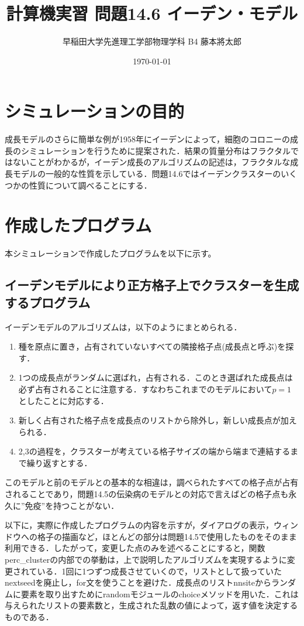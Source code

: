 \documentclass{jsarticle}
\title{計算機実習 問題14.6 イーデン・モデル}
\author{早稲田大学先進理工学部物理学科 B4 藤本將太郎}
\date{\today}
\begin{document}
\maketitle
    
\section{シミュレーションの目的}
        成長モデルのさらに簡単な例が1958年にイーデンによって，細胞のコロニーの成長のシミュレーションを行うために提案された．結果の質量分布はフラクタルではないことがわかるが，イーデン成長のアルゴリズムの記述は，フラクタルな成長モデルの一般的な性質を示している．問題14.6ではイーデンクラスターのいくつかの性質について調べることにする．

\section{作成したプログラム}
    本シミュレーションで作成したプログラムを以下に示す。


    \subsection{イーデンモデルにより正方格子上でクラスターを生成するプログラム}
    
        イーデンモデルのアルゴリズムは，以下のようにまとめられる．
        \begin{enumerate}
            \item 種を原点に置き，占有されていないすべての隣接格子点(成長点と呼ぶ)を探す．
            \item 1つの成長点がランダムに選ばれ，占有される．このとき選ばれた成長点は必ず占有されることに注意する．すなわちこれまでのモデルにおいて$p=1$としたことに対応する．
            \item 新しく占有された格子点を成長点のリストから除外し，新しい成長点が加えられる．
            \item 2,3の過程を，クラスターが考えている格子サイズの端から端まで連結するまで繰り返すとする．
            
        \end{enumerate}
        
        このモデルと前のモデルとの基本的な相違は，調べられたすべての格子点が占有されることであり，問題14.5の伝染病のモデルとの対応で言えばどの格子点も永久に”免疫”を持つことがない．
        
        以下に，実際に作成したプログラムの内容を示すが，ダイアログの表示，ウィンドウへの格子の描画など，ほとんどの部分は問題14.5で使用したものをそのまま利用できる．したがって，変更した点のみを述べることにすると，関数perc\_clusterの内部での挙動は，上で説明したアルゴリズムを実現するように変更されている．1回に1つずつ成長させていくので，リストとして扱っていたnextseedを廃止し，for文を使うことを避けた．成長点のリストnnsiteからランダムに要素を取り出すためにrandomモジュールのchoiceメソッドを用いた．これは与えられたリストの要素数と，生成された乱数の値によって，返す値を決定するものである．
        
\end{document}
